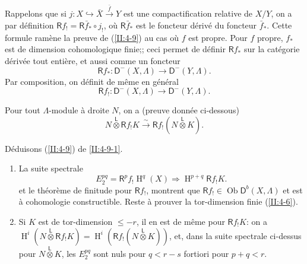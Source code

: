 \documentclass{book}
\DeclareMathOperator{\h}{H}
\DeclareMathOperator{\ob}{Ob}
\newcommand{\iso}{\xrightarrow\sim}
\newcommand{\R}{\mathsf{R}}
\newcommand{\D}{\mathsf{D}}
\newcommand{\lotimes}{{\overset{\mathsf{L}}{\otimes}}}
\begin{document}
Rappelons que si $j:X\hookrightarrow \bar X \xrightarrow{\bar f} Y$ est une 
compactification relative de $X/Y$, on a par d\'efinition 
$\R f_! = \R \bar f_* \circ j_!$, o\`u $\R \bar f_*$ est le foncteur d\'eriv\'e 
du foncteur $\bar f_*$. Cette formule ram\`ene la preuve de (\ref{II:4-9}) 
au cas o\`u $f$ est propre. Pour $f$ propre, $f_*$ est de dimension 
cohomologique finie;; ceci permet de d\'efinir $\R f_*$ sur la cat\'egorie 
d\'eriv\'ee tout enti\`ere, et aussi comme un foncteur 
\[
  \R f_* : \D^-(X,\Lambda) \to \D^-(Y,\Lambda) \text{.}
\]
Par composition, on d\'efinit de m\^eme en g\'en\'eral 
\[
  \R f_! : \D^-(X,\Lambda) \to \D^-(Y,\Lambda) \text{.}
\]

Pour tout $\Lambda$-module \`a droite $N$, on a (preuve donn\'ee ci-dessous) 
\begin{equation}\label{II:4-9-1}
  N\lotimes \R f_! K \iso \R f_! (N\lotimes K) \text{.}
\end{equation}

D\'eduisons (\ref{II:4-9}) de \eqref{II:4-9-1}. 
\begin{enumerate}[\indent a)]
  \item La suite spectrale 
    \[
      E_2^{p q} = \R^p f_! \h^q(X) \Rightarrow \h^{p+q} \R f_! K \text{.}
    \]
    et le th\'eor\`eme de finitude pour $\R f_!$, montrent que 
    $\R f_!\in \ob \D^b(X,\Lambda)$ et est \`a cohomologie constructible. 
    Reste \`a prouver la tor-dimension finie (\ref{II:4-6}). 
  \item Si $K$ est de tor-dimension $\leqslant -r$, il en est de m\^eme pour 
    $\R f_! K$: on a $\h^i(N\lotimes \R f_! K) = \h^i(\R f_!(N\lotimes K))$, 
    et, dans la suite spectrale ci-dessus pour $N\lotimes K$, les 
    $E_2^{p q}$ sont nuls pour $q<r-s$ fortiori pour $p+q<r$. 
\end{enumerate}
\end{document}
